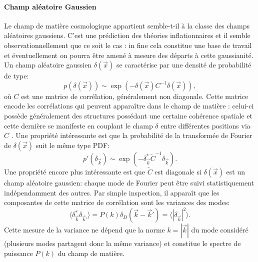 \paragraph{Champ aléatoire Gaussien} Le champ de matière cosmologique appartient semble-t-il à la classe des champs aléatoires gaussiens. C'est une prédiction des théories inflationnaires et il semble observationnellement que ce soit le cas : in fine cela constitue une base de travail et éventuellement on pourra être amené à mesure des départs à cette gaussianité. Un champ aléatoire gaussien $\delta(\vec x)$ se caractérise par une densité de probabilité de type:
\begin{equation}
p(\delta(\vec x)) \sim \exp( -\delta (\vec x) C^{-1} \delta (\vec x)),
\end{equation}
où $C$ est une matrice de corrélation, généralement non diagonale. Cette matrice encode les corrélations qui peuvent apparaître dans le champ de matière : celui-ci possède généralement des structures possédant une certaine cohérence spatiale et cette dernière se manifeste en couplant le champ $\delta$ entre différentes positions via $C$ . Une propriété intéressante est que la probabilité de la transformée de Fourier de $\delta (\vec x)$ suit le même type PDF:
\begin{equation}
p'(\delta_{\vec k})\sim \exp( -\delta_{\vec k}^* \tilde C^{-1} \delta_{\vec k}).
\end{equation}
Une propriété encore plus intéressante est que $\tilde C$ est diagonale si $\delta(\vec x)$ est un champ aléatoire gaussien: chaque mode de Fourier peut être suivi statistiquement indépendamment des autres. Par simple inspection, il apparaît que les composantes de cette matrice de corrélation sont les variances des modes:
\begin{equation}
\langle \delta_{\vec k}^* \delta_{\vec k'}\rangle = P(k)\delta_D(\vec k -\vec k')=\langle|\delta_{\vec k}|^2\rangle.
\end{equation}
Cette mesure de la variance ne dépend que la norme $k=|\vec k|$ du mode considéré (plusieurs modes partagent donc la même variance) et constitue le spectre de puissance $P(k)$ du champ de matière.

